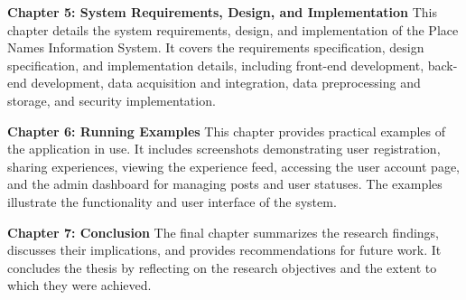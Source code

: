\textbf{Chapter 5: System Requirements, Design, and Implementation}\newline
This chapter details the system requirements, design, and implementation of the Place Names Information System. It covers the requirements specification, design specification, and implementation details, including front-end development, back-end development, data acquisition and integration, data preprocessing and storage, and security implementation.

\textbf{Chapter 6: Running Examples}\newline
This chapter provides practical examples of the application in use. It includes screenshots demonstrating user registration, sharing experiences, viewing the experience feed, accessing the user account page, and the admin dashboard for managing posts and user statuses. The examples illustrate the functionality and user interface of the system.

\textbf{Chapter 7: Conclusion}\newline
The final chapter summarizes the research findings, discusses their implications, and provides recommendations for future work. It concludes the thesis by reflecting on the research objectives and the extent to which they were achieved.
